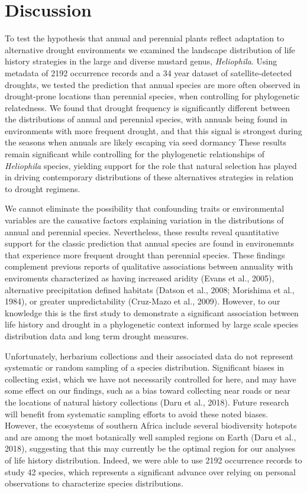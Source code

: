 \documentclass[man,floatsintext]{apa6}
\theoremstyle{definition}
\theoremstyle{definition}
\theoremstyle{definition}
\theoremstyle{remark}
\begin{document}
\hypertarget{discussion}{%
\section{Discussion}\label{discussion}}

To test the hypothesis that annual and perennial plants reflect
adaptation to alternative drought environments we examined the landscape
distribution of life history strategies in the large and diverse mustard
genus, \emph{Heliophila}. Using metadata of 2192 occurrence records and
a 34 year dataset of satellite-detected droughts, we tested the
prediction that annual species are more often observed in drought-prone
locations than perennial species, when controlling for phylogenetic
relatedness. We found that drought frequency is significantly different
between the distributions of annual and perennial species, with annuals
being found in environments with more frequent drought, and that this
signal is strongest during the seasons when annuals are likely escaping
via seed dormancy These results remain significant while controlling for
the phylogenetic relationships of \emph{Heliophila} species, yielding
support for the role that natural selection has played in driving
contemporary distributions of these alternatives strategies in relation
to drought regimens.

We cannot eliminate the possibility that confounding traits or
environmental variables are the causative factors explaining variation
in the distributions of annual and perennial species. Nevertheless,
these results reveal quantitative support for the classic prediction
that annual species are found in environemnts that experience more
frequent drought than perennial species. These findings complement
previous reports of qualitative associations between annuality with
enviroments characterized as having increased aridity (Evans et al.,
2005), alternative precipitation defined habitats (Datson et al., 2008;
Morishima et al., 1984), or greater unpredictability (Cruz-Mazo et al.,
2009). However, to our knowledge this is the first study to demonstrate
a significant association between life history and drought in a
phylogenetic context informed by large scale species distribution data
and long term drought measures.

Unfortunately, herbarium collections and their associated data do not
represent systematic or random sampling of a species distribution.
Significant biases in collecting exist, which we have not necessarily
controlled for here, and may have some effect on our findings, such as a
bias toward collecting near roads or near the locations of natural
history collections (Daru et al., 2018). Future research will benefit
from systematic sampling efforts to avoid these noted biases. However,
the ecosystems of southern Africa include several biodiversity hotspots
and are among the most botanically well sampled regions on Earth (Daru
et al., 2018), suggesting that this may currently be the optimal region
for our analyses of life history distribution. Indeed, we were able to
use 2192 occurrence records to study 42 species, which represents a
significant advance over relying on personal observations to
characterize species distributions.
\end{document}
